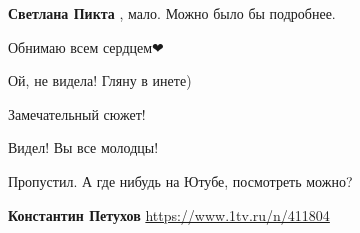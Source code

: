 \begin{itemize}
\begin{itemize}
\textbf{Светлана Пикта} , мало. Можно было бы подробнее.

\end{itemize}

 
Обнимаю всем сердцем❤

 
Ой, не видела! Гляну в инете)

 
Замечательный сюжет!

 
Видел! Вы все молодцы!

 
Пропустил. А где нибудь на Ютубе, посмотреть можно?

\begin{itemize}
 
\textbf{Константин Петухов} \url{https://www.1tv.ru/n/411804}

 

\end{itemize}
\end{itemize}
